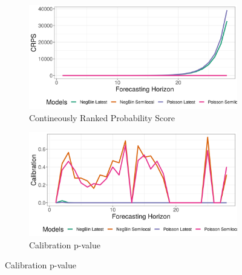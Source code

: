 \begin{figure}[H]
\begin{subfigure}{0.5\textwidth}
  \centering
  \includegraphics[width=\linewidth]{../output/Kayna_crps.png}  
  \caption{Contineously Ranked Probability Score}
  \label{Kayna_scores_1}
\end{subfigure}
\begin{subfigure}{0.5\textwidth}
  \centering
  \includegraphics[width=\linewidth]{../output/Kayna_calibration.png}  
  \caption{Calibration p-value}
  \label{Kayna_scores_2}
\end{subfigure}


\end{figure}
